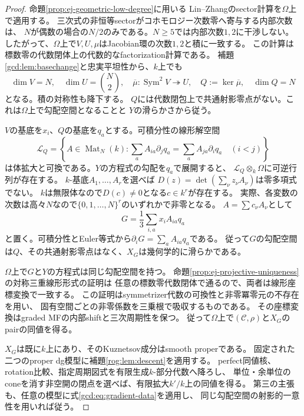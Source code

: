 \begin{proof}
命題\ref{prop:ej-geometric-low-degree}に用いる
Lin--Zhangのsector計算\cite[Theorem~3.5, Remark~3.6]{LZ}を$\Omega$上で適用する。
三次式の非恒等sectorがコホモロジー次数零へ寄与する内部次数は、
$N$が偶数の場合の$N/2$のみである。$N\ge5$では内部次数$1,2$に干渉しない。
したがって、$\Omega$上で$V,U,\mu$はJacobian環の次数$1,2$と積に一致する。
この計算は標数零の代数閉体上の代数的なfactorization計算である。
補題\ref{gcd:lem:basechange}と忠実平坦性から、$k$上でも
\begin{equation}\label{gcd:eq:gradient-data}
 \dim V=N,\quad \dim U=\binom N2,\quad
 \overline\mu:\operatorname{Sym}^2V\twoheadrightarrow U,\quad
 Q:=\ker\overline\mu,\quad\dim Q=N
\end{equation}
となる。積の対称性も降下する。
$Q$には代数閉包上で共通射影零点がない。これは$\Omega$上で勾配空間となることと
$Y$の滑らかさから従う。

$V$の基底を$x_i$、$Q$の基底を$q_a$とする。可積分性の線形解空間
\begin{equation}\label{gcd:eq:integrability}
 \mathcal L_Q=\left\{A\in\operatorname{Mat}_N(k):
 \sum_a A_{ia}\partial_jq_a=\sum_a A_{ja}\partial_iq_a\quad(i<j)\right\}
\end{equation}
は体拡大と可換である。$Y$の方程式の勾配を$q_a$で展開すると、
$\mathcal L_Q\otimes_k\Omega$に可逆行列が存在する。
$k$-基底$A_1,\ldots,A_r$を選べば
$D(z)=\det(\sum_\nu z_\nu A_\nu)$は零多項式でない。
$k$は無限体なので$D(c)\ne0$となる$c\in k^r$が存在する。
実際、各変数の次数は高々$N$なので$\{0,1,\ldots,N\}^r$のいずれかで非零となる。
$A=\sum c_\nu A_\nu$として
\begin{equation}\label{gcd:eq:model}
 G=\frac13\sum_{i,a}x_iA_{ia}q_a
\end{equation}
と置く。可積分性とEuler等式から$\partial_iG=\sum_aA_{ia}q_a$である。
従って$G$の勾配空間は$Q$、その共通射影零点はなく、$X_G$は幾何学的に滑らかである。

$\Omega$上で$G$と$Y$の方程式は同じ勾配空間を持つ。
命題\ref{prop:ej-projective-uniqueness}の対称三重線形形式の証明は
任意の標数零代数閉体で通るので、両者は線形座標変換で一致する。
この証明はsymmetrizer代数の可換性と非零冪零元の不存在を用い、
固有空間ごとの非零係数を三乗根で吸収するものである。
その座標変換はgraded MFの内部shiftと三次周期性を保つ。
従って$\Omega$上で$(\mathcal C,\rho)$と$X_G$のpairの同値を得る。

$X_G$は既に$k$上にあり、そのKuznetsov成分はsmooth properである。
固定された二つのproper dg模型に補題\ref{rog:lem:descent}を適用する。
perfect同値核、rotation比較、指定周期図式を有限生成$k$-部分代数へ降ろし、
単位・余単位のconeを消す非空開の閉点を選べば、有限拡大$k'/k$上の同値を得る。
第三の主張も、任意の模型に式\eqref{gcd:eq:gradient-data}を適用し、
同じ勾配空間の射影的一意性を用いれば従う。
\end{proof}

